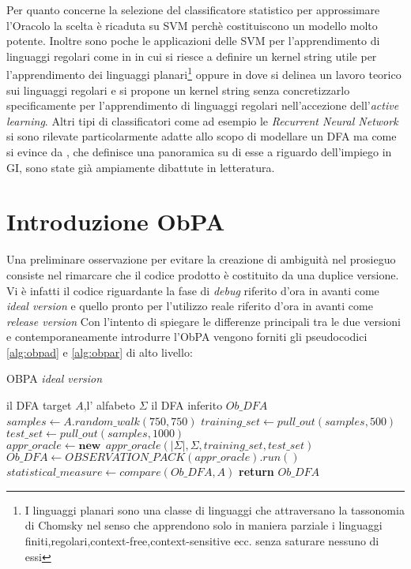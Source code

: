 Per quanto concerne la selezione del classificatore statistico per approssimare l'Oracolo la scelta è ricaduta su \ac{SVM} perchè costituiscono un modello molto potente. Inoltre sono poche le applicazioni delle \ac{SVM} per l'apprendimento di linguaggi regolari come in \cite{Clark11}\cite{Clark06}  in cui si riesce a definire un kernel string utile per l'apprendimento dei linguaggi planari\footnote{I linguaggi planari sono una classe di linguaggi che attraversano la tassonomia di Chomsky nel senso che apprendono solo in maniera parziale i linguaggi finiti,regolari,context-free,context-sensitive ecc. senza saturare nessuno di essi}  oppure in \cite{Kontorovich09} dove si delinea un lavoro teorico sui linguaggi regolari e si propone un kernel string senza concretizzarlo specificamente per l'apprendimento di linguaggi regolari nell'accezione dell'\textit{active learning}. Altri tipi di classificatori come ad esempio le \textit{Recurrent Neural Network} si sono rilevate particolarmente adatte allo scopo di modellare un \ac{DFA} ma come si evince da \cite{Forcada02}, che definisce una panoramica su di esse a riguardo dell'impiego in  \ac{GI}, sono state già ampiamente dibattute in letteratura.

\section{Introduzione ObPA}
Una preliminare osservazione per evitare la creazione di ambiguità nel prosieguo consiste nel rimarcare che il codice prodotto è costituito da una duplice versione. Vi è infatti il codice riguardante la fase di \textit{debug} riferito d'ora in avanti come \textit{ideal version} e quello pronto per l'utilizzo reale riferito d'ora in avanti come \textit{release version}
  Con l'intento di spiegare le differenze principali tra le due versioni e contemporaneamente introdurre l'\ac{ObPA} vengono forniti gli pseudocodici \ref{alg:obpad} e \ref{alg:obpar} di alto livello:

\begin{algorithm}
\caption{OBPA \textit{ideal version}}\label{alg:obpad}
\begin{algorithmic}[1]
\Statex
\Input il \ac{DFA} target $A$,l' alfabeto $\Sigma$ 
\Output il \ac{DFA} inferito $Ob\_DFA$
\State $samples \gets A.random\_walk(750,750)$
\State $training\_set \gets pull\_out(samples,500)$
\State $test\_set \gets pull\_out(samples,1000)$
\State $appr\_oracle \gets \textbf{new}\:\: appr\_oracle(|\Sigma|,\Sigma,training\_set,test\_set)$
\State $Ob\_DFA \gets OBSERVATION\_PACK(appr\_oracle).run()$
\State $statistical\_measure \gets compare(Ob\_DFA , A)$
 \State \textbf{return} $Ob\_DFA$
     
\end{algorithmic}
\end{algorithm}




